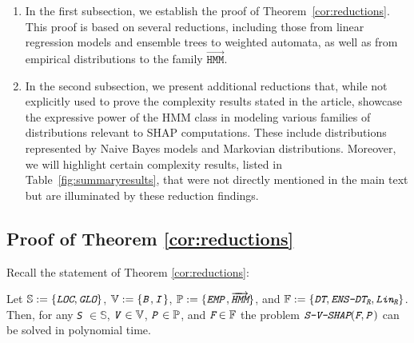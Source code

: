 \begin{enumerate}
\item 
In the first subsection, we establish the proof of Theorem~\ref{cor:reductions}. This proof is based on several reductions, including those from linear regression models and ensemble trees to weighted automata, as well as from empirical distributions to the family $\overrightarrow{\texttt{HMM}}$.


\item In the second subsection, we present additional reductions that, while not explicitly used to prove the complexity results stated in the article, showcase the expressive power of the HMM class in modeling various families of distributions relevant to SHAP computations. These include distributions represented by Naive Bayes models and Markovian distributions. Moreover, we will highlight certain complexity results, listed in Table~\ref{fig:summaryresults}, that were not directly mentioned in the main text but are illuminated by these reduction findings.


\end{enumerate} 

\subsection{Proof of Theorem \ref{cor:reductions}}

Recall the statement of Theorem \ref{cor:reductions}:

\begin{unumberedtheorem}
        Let $\mathbb{S}:= \{ \emph{\texttt{LOC}}, \emph{\texttt{GLO}} \}$, $\mathbb{V} := \{\texttt{\emph{B}}, \texttt{\emph{I}}\}$, $\mathbb{P}:= \{ \texttt{\emph{EMP}}, \overrightarrow{\emph{\texttt{HMM}}} \} $, and $\mathbb{F}:= \{\emph{\texttt{DT}}, \emph{\texttt{ENS-DT}}_{\emph{\texttt{R}}}, \emph{\texttt{Lin}}_{\emph{\texttt{R}}}\}$. Then, for any \emph{\texttt{S}} $\in \mathbb{S}$, $\texttt{\emph{V}} \in \mathbb{V}$, $\texttt{\emph{P}} \in \mathbb{P}$, and $\emph{\texttt{F}}\in \mathbb{F}$ the problem  $\emph{\texttt{S-V-SHAP}}(\emph{\texttt{F}}, \texttt{\emph{P}})$ can be solved in polynomial time.
\end{unumberedtheorem}

